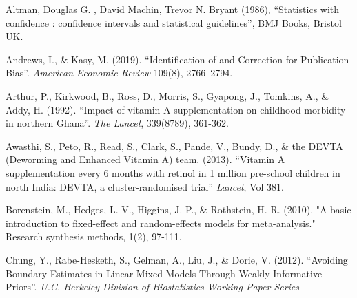 \documentclass[12pt]{article}
\begin{document}
\clearpage



\begin{thebibliography}{99}

 Altman,  Douglas G. , David Machin, Trevor N. Bryant (1986), ``Statistics with confidence : confidence intervals and statistical guidelines'', BMJ Books, Bristol UK. 

 Andrews, I., \& Kasy, M. (2019). ``Identification of and Correction for Publication Bias''. \emph{American Economic Review} 109(8), 2766--2794.

 Arthur, P., Kirkwood, B., Ross, D., Morris, S., Gyapong, J., Tomkins, A., \& Addy, H. (1992). ``Impact of vitamin A supplementation on childhood morbidity in northern Ghana''. \emph{The Lancet}, 339(8789), 361-362.

 Awasthi, S., Peto, R., Read, S., Clark, S., Pande, V., Bundy, D., \& the DEVTA (Deworming and Enhanced Vitamin A) team. (2013). ``Vitamin A supplementation every 6 months with retinol in 1 million pre-school children in north India: DEVTA, a cluster-randomised trial'' \emph{Lancet}, Vol 381.


 Borenstein, M., Hedges, L. V., Higgins, J. P., \& Rothstein, H. R. (2010). "A basic introduction to fixed-effect and random-effects models for meta-analysis." Research synthesis methods, 1(2), 97-111.


 Chung, Y., Rabe-Hesketh, S., Gelman, A., Liu, J., \& Dorie, V. (2012). ``Avoiding Boundary Estimates in Linear Mixed Models Through Weakly Informative Priors''. \emph{U.C. Berkeley Division of Biostatistics Working Paper Series}



\end{thebibliography}
\end{document}
